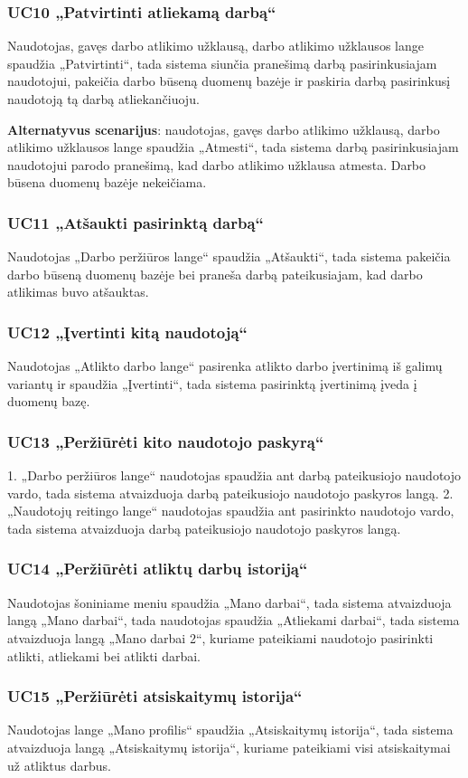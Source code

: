 \documentclass{VUMIFPSbakalaurinis}
\begin{document}
\subsubsection{UC10 „Patvirtinti atliekamą darbą“}
Naudotojas, gavęs darbo atlikimo užklausą, darbo atlikimo užklausos lange spaudžia „Patvirtinti“, tada sistema siunčia pranešimą darbą pasirinkusiajam naudotojui, pakeičia darbo būseną duomenų bazėje ir paskiria darbą pasirinkusį naudotoją tą darbą atliekančiuoju. 
\par \textbf{Alternatyvus scenarijus}: naudotojas, gavęs darbo atlikimo užklausą, darbo atlikimo užklausos lange spaudžia „Atmesti“, tada sistema darbą pasirinkusiajam naudotojui parodo pranešimą, kad darbo atlikimo užklausa atmesta. Darbo būsena duomenų bazėje nekeičiama.
\subsubsection{UC11 „Atšaukti pasirinktą darbą“}
Naudotojas „Darbo peržiūros lange“ spaudžia „Atšaukti“, tada sistema pakeičia darbo būseną duomenų bazėje bei praneša darbą pateikusiajam, kad darbo atlikimas buvo atšauktas.
\subsubsection{UC12 „Įvertinti kitą naudotoją“}
Naudotojas „Atlikto darbo lange“ pasirenka atlikto darbo įvertinimą iš galimų variantų ir spaudžia „Įvertinti“, tada sistema pasirinktą įvertinimą įveda į duomenų bazę.
\subsubsection{UC13 „Peržiūrėti kito naudotojo paskyrą“}
1. „Darbo peržiūros lange“ naudotojas spaudžia ant darbą pateikusiojo naudotojo vardo, tada sistema atvaizduoja darbą pateikusiojo naudotojo paskyros langą.
2. „Naudotojų reitingo lange“ naudotojas spaudžia ant pasirinkto naudotojo vardo, tada sistema atvaizduoja darbą pateikusiojo naudotojo paskyros langą.
\subsubsection{UC14 „Peržiūrėti atliktų darbų istoriją“}
Naudotojas šoniniame meniu spaudžia „Mano darbai“, tada sistema atvaizduoja langą „Mano darbai“, tada naudotojas spaudžia „Atliekami darbai“, tada sistema atvaizduoja langą „Mano darbai 2“, kuriame pateikiami naudotojo pasirinkti atlikti, atliekami bei atlikti darbai. 
\subsubsection{UC15 „Peržiūrėti atsiskaitymų istorija“}
Naudotojas lange „Mano profilis“ spaudžia „Atsiskaitymų istorija“, tada sistema atvaizduoja langą „Atsiskaitymų istorija“, kuriame pateikiami visi atsiskaitymai už atliktus darbus.
\end{document}
